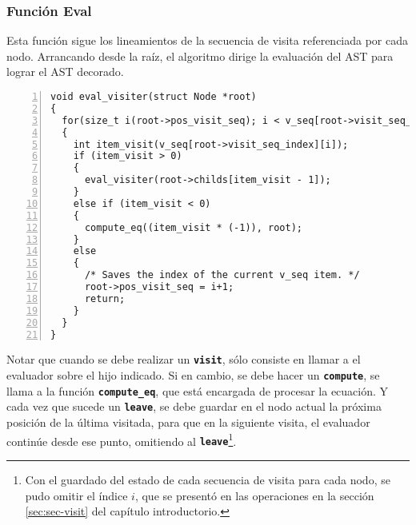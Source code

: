 \documentclass[runningheads,a4paper]{llncs}
\newcommand{\textbtt}[1]{\texttt{\textbf{#1}}}
\begin{document}
\subsubsection{Función Eval}

Esta función sigue los lineamientos de la secuencia de visita referenciada por cada nodo. Arrancando desde la raíz, el algoritmo dirige la evaluación del AST para lograr el AST decorado.

\begin{lstlisting}[numbers=left, columns=fullflexible]
void eval_visiter(struct Node *root)
{
  for(size_t i(root->pos_visit_seq); i < v_seq[root->visit_seq_index].size(); i++)
  {
    int item_visit(v_seq[root->visit_seq_index][i]);
    if (item_visit > 0)
    {
      eval_visiter(root->childs[item_visit - 1]);
    }
    else if (item_visit < 0)
    {
      compute_eq((item_visit * (-1)), root);
    }
    else
    {
      /* Saves the index of the current v_seq item. */
      root->pos_visit_seq = i+1;
      return;
    }
  }
}
\end{lstlisting}

Notar que cuando se debe realizar un \textbtt{visit}, sólo consiste en llamar a el evaluador sobre el hijo indicado. Si en cambio, se debe hacer un \textbtt{compute}, se llama a la función \textbtt{compute\_eq}, que está encargada de procesar la ecuación. Y cada vez que sucede un \textbtt{leave}, se debe guardar en el nodo actual la próxima posición de la última visitada, para que en la siguiente visita, el evaluador continúe desde ese punto, omitiendo al \textbtt{leave}\footnote{Con el guardado del estado de cada secuencia de visita para cada nodo, se pudo omitir el índice $i$, que se presentó en las operaciones en la sección \ref{sec:sec-visit} del capítulo introductorio.}.
\end{document}
